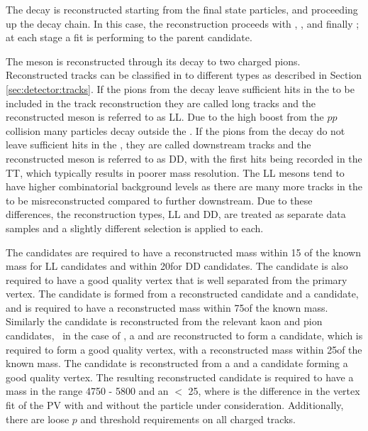 The decay is reconstructed starting from the final state particles, and proceeding up the decay chain. In this case, the reconstruction proceeds with \decay{\KS}{\pim\pim}, \decay{\Kstarm}{\KS\pim}, \decay{\Dz}{\Km\pip} and finally \decay{\Bm}{\D\Kstarm}; at each stage a fit is performing to the parent candidate.

The \KS meson is reconstructed through its decay to two charged pions. Reconstructed tracks can be classified in to different types as described in Section \ref{sec:detector:tracks}. If the pions from the \KS decay leave sufficient hits in the \velo to be included in the track reconstruction they are called long tracks and the reconstructed \KS meson is referred to as LL. Due to the high boost from the $pp$ collision many \KS particles decay outside the \velo. If the pions from the \KS decay do not leave sufficient hits in the \velo, they are called downstream tracks and the reconstructed \KS meson is referred to as DD, with the first hits being recorded in the TT, which typically results in poorer mass resolution. The LL \KS mesons tend to have higher combinatorial background levels as there are many more tracks in the \velo to be misreconstructed compared to further downstream. Due to these differences, the \KS reconstruction types, LL and DD, are treated as separate data samples and a slightly different selection is applied to each.

The \KS candidates are required to have a reconstructed mass within 15 \mevcc of the known mass for LL \KS candidates and within 20\mevcc for DD \KS candidates. The \KS candidate is also required to have a good quality vertex that is well separated from the primary vertex. The \Kstarm candidate is formed from a reconstructed \KS candidate and a \pim candidate, and is required to have a reconstructed mass within 75\mev of the known \Kstarm mass. Similarly the \Dz candidate is reconstructed from the relevant kaon and pion candidates, \eg~in the case of \kpi, a \Km and \pip are reconstructed to form a \Dz candidate, which is required to form a good quality vertex, with a reconstructed mass within 25\mevcc of the known \Dz mass. The \Bm candidate is reconstructed from a \Dz and a \KS candidate forming a good quality vertex. The resulting reconstructed \Bm candidate is required to have a mass in the range 4750 - 5800 \mevcc and an \chisqip $<$ 25, where \chisqip is the difference in the vertex fit \chisq of the PV with and without the particle under consideration. Additionally, there are loose $p$ and \pt threshold requirements on all charged tracks.

